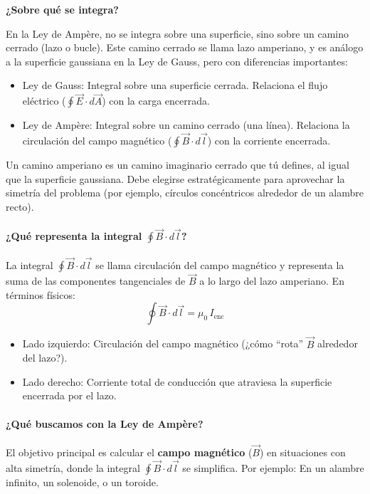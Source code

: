 \begin{tcolorbox}[myconclusion]
\textbf{¿Sobre qué se integra?}

En la Ley de Ampère, no se integra sobre una superficie, sino sobre un camino cerrado (lazo o bucle). Este camino cerrado se llama lazo amperiano, y es análogo a la superficie gaussiana en la Ley de Gauss, pero con diferencias importantes:
\begin{itemize}
  \item Ley de Gauss: Integral sobre una superficie cerrada.
  \subitem Relaciona el flujo eléctrico (\(\oint \vec{E} \cdot d\vec{A}\)) con la carga encerrada.  
  \item Ley de Ampère: Integral sobre un camino cerrado (una línea).
  \subitem Relaciona la circulación del campo magnético (\(\oint \vec{B} \cdot d\vec{l}\)) con la corriente encerrada.  
\end{itemize}
\end{tcolorbox}

Un camino amperiano es un camino imaginario cerrado que tú defines, al igual que la superficie gaussiana. Debe elegirse estratégicamente para aprovechar la simetría del problema (por ejemplo, círculos concéntricos alrededor de un alambre recto). 

\paragraph{¿Qué representa la integral \(\oint \vec{B} \cdot d\vec{l}\)?}

La integral \(\oint \vec{B} \cdot d\vec{l}\) se llama circulación del campo magnético y representa la suma de las componentes tangenciales de \(\vec{B}\) a lo largo del lazo amperiano. En términos físicos:
\[
\oint \vec{B} \cdot d\vec{l} = \mu_0 \, I_{\text{enc}}
\]
\begin{itemize}
  \item Lado izquierdo: Circulación del campo magnético (¿cómo ``rota'' \(\vec{B}\) alrededor del lazo?).  
  \item Lado derecho: Corriente total de conducción que atraviesa la superficie encerrada por el lazo.  
\end{itemize}

\paragraph{¿Qué buscamos con la Ley de Ampère?}

El objetivo principal es calcular el \textbf{campo magnético} (\(\vec{B}\)) en situaciones con alta simetría, donde la integral \(\oint \vec{B} \cdot d\vec{l}\) se simplifica. Por ejemplo: En un alambre infinito, un solenoide, o un toroide.  

